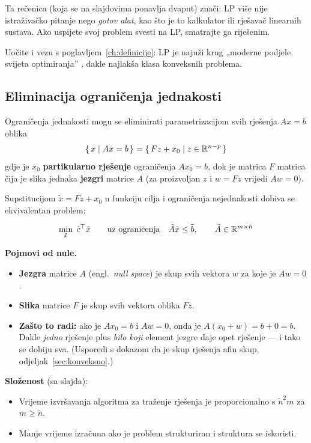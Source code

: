 \begin{napomena}[„tehnologija”]
Ta rečenica (koja se na slajdovima ponavlja dvaput) znači: LP više nije
istraživačko pitanje nego \emph{gotov alat}, kao što je to kalkulator ili
rješavač linearnih sustava. Ako uspijete svoj problem svesti na LP, smatrajte
ga riješenim.

Uočite i vezu s poglavljem~\ref{ch:definicije}: LP je najuži krug „moderne
podjele svijeta optimiranja” , dakle najlakša klasa konveksnih
problema.
\end{napomena}

\subsection{Eliminacija ograničenja jednakosti}

Ograničenja jednakosti mogu se eliminirati parametrizacijom svih rješenja
$Ax = b$ oblika
\[
\{\, x \mid Ax = b \,\} = \{\, Fz + x_0 \mid z \in \mathbb{R}^{n-p} \,\}
\]
gdje je $x_0$ \textbf{partikularno rješenje} ograničenja $Ax_0 = b$, dok je
matrica $F$ matrica čija je slika jednaka \textbf{jezgri} matrice $A$ (za
proizvoljan $z$ i $w = Fz$ vrijedi $Aw = 0$).

Supstitucijom $\tilde x = Fz + x_0$ u funkciju cilja i ograničenja nejednakosti
dobiva se ekvivalentan problem:

\begin{definicija}
\[
\min_{\tilde x} \; \tilde c^{\top}\tilde x
\qquad\text{uz ograničenja}\quad
\tilde A\tilde x \le \tilde b, \qquad \tilde A \in \mathbb{R}^{m\times\tilde n}
\]
\end{definicija}

\textbf{Pojmovi od nule.}
\begin{itemize}
  \item \textbf{Jezgra} matrice $A$ (engl.\ \emph{null space}) je skup svih
        vektora $w$ za koje je $Aw = 0$.
  \item \textbf{Slika} matrice $F$ je skup svih vektora oblika $Fz$.
  \item \textbf{Zašto to radi:} ako je $Ax_0 = b$ i $Aw = 0$, onda je
        $A(x_0 + w) = b + 0 = b$. Dakle \emph{jedno} rješenje plus \emph{bilo
        koji} element jezgre daje opet rješenje --- i tako se dobiju sva.
        (Usporedi s dokazom da je skup rješenja afin skup,
        odjeljak~\ref{sec:konveksno}.)
\end{itemize}

\textbf{Složenost} (sa slajda):
\begin{itemize}
  \item Vrijeme izvršavanja algoritma za traženje rješenja je proporcionalno s
        $\tilde n^2 m$ za $m \ge \tilde n$.
  \item Manje vrijeme izračuna ako je problem strukturiran i struktura se
        iskoristi.
\end{itemize}

